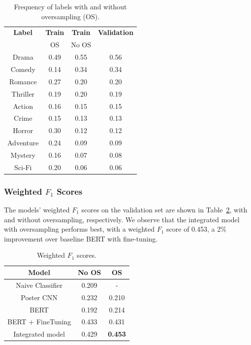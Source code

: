 \documentclass[10pt]{article}
\begin{document}
\begin{table}[h]
\begin{center}
\begin{tabular}{cccc}
\hline \bf Label & \bf Train  & \bf Train  & \bf Validation \\  
& OS & No OS & \\
\hline
Drama & 0.49 &  0.55 & 0.56  \\
Comedy & 0.14 & 0.34 & 0.34\\
Romance & 0.27 & 0.20 & 0.20  \\
Thriller & 0.19 & 0.20 & 0.19 \\
Action & 0.16 &  0.15 & 0.15 \\
Crime & 0.15 & 0.13 & 0.13 \\
Horror & 0.30 & 0.12 & 0.12  \\
Adventure &  0.24 & 0.09 & 0.09  \\
Mystery & 0.16 &  0.07 & 0.08  \\
Sci-Fi & 0.20 & 0.06 & 0.06  \\
\hline
\end{tabular}
\end{center}
\captionsetup{justification=centering}
\caption{\label{FreqTable} Frequency of labels with and without oversampling (OS). }
\end{table}

\subsubsection{Weighted $F_1$ Scores}
The models' weighted $F_1$ scores on the validation set are shown in Table~\ref{F1Table}, with and without oversampling, respectively. We observe that the integrated model with oversampling performs best, with a weighted $F_1$ score of 0.453, a 2\% improvement over baseline BERT with fine-tuning.

\begin{table}[h]
\begin{center}
\begin{tabular}{ccc}
\hline \bf Model & \bf No OS  & \bf OS \\ \hline
Naive Classifier & 0.209 & - \\
Poster CNN & 0.232 & 0.210 \\
BERT & 0.192 & 0.214  \\
BERT + FineTuning & 0.433 & 0.431\\
Integrated model & 0.429 & \bf 0.453 \\
\hline
\end{tabular}
\end{center}
\caption{\label{F1Table} Weighted $F_1$ scores. }
\end{table}
\end{document}
